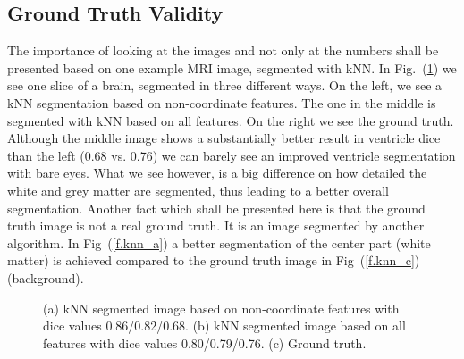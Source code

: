 \documentclass[journal]{IEEEtran}
\begin{document}
\subsection{Ground Truth Validity}

The importance of looking at the images and not only at the numbers shall be presented based on one example MRI image, segmented with kNN. In Fig.~(\ref{f.ground_truth}) we see one slice of a brain, segmented in three different ways. On the left, we see a kNN segmentation based on non-coordinate features. The one in the middle is segmented with kNN based on all features. On the right we see the ground truth. Although the middle image shows a substantially better result in ventricle dice than the left (0.68 vs. 0.76) we can barely see an improved ventricle segmentation with bare eyes. What we see however, is a big difference on how detailed the white and grey matter are segmented, thus leading to a better overall segmentation. Another fact which shall be presented here is that the ground truth image is not a real ground truth. It is an image segmented by another algorithm. In Fig~(\ref{f.knn_a}) a better segmentation of the center part (white matter) is achieved compared to the ground truth image in Fig~(\ref{f.knn_c}) (background).

\begin{figure}
	\centering
	\hfill
	\hfill
	\caption{(a) kNN segmented image based on non-coordinate features with dice values 0.86/0.82/0.68. (b) kNN segmented image based on all features with dice values 0.80/0.79/0.76. (c) Ground truth.}
	\label{f.ground_truth}
\end{figure}
\end{document}
